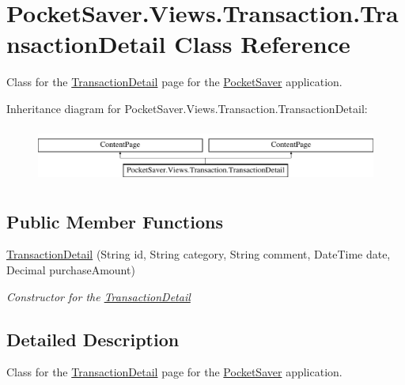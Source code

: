 \hypertarget{class_pocket_saver_1_1_views_1_1_transaction_1_1_transaction_detail}{}\section{Pocket\+Saver.\+Views.\+Transaction.\+Transaction\+Detail Class Reference}
\label{class_pocket_saver_1_1_views_1_1_transaction_1_1_transaction_detail}


Class for the \hyperlink{class_pocket_saver_1_1_views_1_1_transaction_1_1_transaction_detail}{Transaction\+Detail} page for the \hyperlink{namespace_pocket_saver}{Pocket\+Saver} application.  


Inheritance diagram for Pocket\+Saver.\+Views.\+Transaction.\+Transaction\+Detail\+:\begin{figure}[H]
\begin{center}
\leavevmode
\includegraphics[height=1.854305cm]{class_pocket_saver_1_1_views_1_1_transaction_1_1_transaction_detail}
\end{center}
\end{figure}
\subsection*{Public Member Functions}
\begin{DoxyCompactItemize}
\item 
\hyperlink{class_pocket_saver_1_1_views_1_1_transaction_1_1_transaction_detail_a3071272e4982e10b355f107097023f90}{Transaction\+Detail} (String id, String category, String comment, Date\+Time date, Decimal purchase\+Amount)
\begin{DoxyCompactList}\small\item\em Constructor for the \hyperlink{class_pocket_saver_1_1_views_1_1_transaction_1_1_transaction_detail}{Transaction\+Detail} \end{DoxyCompactList}\end{DoxyCompactItemize}


\subsection{Detailed Description}
Class for the \hyperlink{class_pocket_saver_1_1_views_1_1_transaction_1_1_transaction_detail}{Transaction\+Detail} page for the \hyperlink{namespace_pocket_saver}{Pocket\+Saver} application. 



